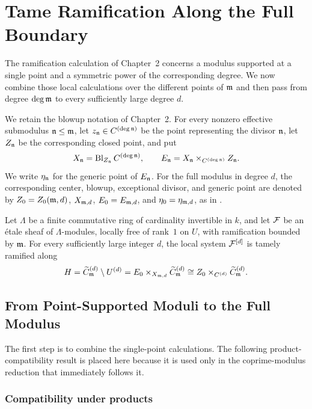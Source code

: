 \section{Tame Ramification Along the Full Boundary}\label{section:tame-ramification-full-boundary}

The ramification calculation of Chapter~2 concerns a modulus supported at a
single point and a symmetric power of the corresponding degree. We now
combine those local calculations over the different points of $\mathfrak{m}$ and
then pass from degree $\deg\mathfrak{m}$ to every sufficiently large degree $d$.

We retain the blowup notation of Chapter~2. For every nonzero effective
submodulus $\mathfrak{n}\leq\mathfrak{m}$, let $z_{\mathfrak{n}}\in C^{(\deg\mathfrak{n})}$ be the
point representing the divisor $\mathfrak{n}$, let $Z_{\mathfrak{n}}$ be the
corresponding closed point, and put
\[
    X_{\mathfrak{n}}=\operatorname{Bl}_{Z_{\mathfrak{n}}}
        C^{(\deg\mathfrak{n})},
    \qquad
    E_{\mathfrak{n}}=X_{\mathfrak{n}}\times_{C^{(\deg\mathfrak{n})}}Z_{\mathfrak{n}}.
\]
We write $\eta_{\mathfrak{n}}$ for the generic point of $E_{\mathfrak{n}}$. For the
full modulus in degree $d$, the corresponding center, blowup, exceptional
divisor, and generic point are denoted by $Z_0=Z_0(\mathfrak{m},d)$,
$X_{\mathfrak{m},d}$, $E_0=E_{\mathfrak{m},d}$, and $\eta_0=\eta_{\mathfrak{m},d}$, as in
.

\begin{theorem}\label{theorem:SymmetricPowerOfSheafIsTamelyRamified}
Let $\Lambda$ be a finite commutative ring of cardinality invertible in $k$, and let
$\mathcal{F}$ be an \'etale sheaf of $\Lambda$-modules, locally free of rank~$1$ on
$U$, with ramification bounded by $\mathfrak{m}$. For every sufficiently large
integer $d$, the local system $\mathcal{F}^{[d]}$ is tamely ramified along
\[
H=\widetilde C^{(d)}_{\mathfrak{m}}\setminus U^{(d)}
  =E_0\times_{X_{\mathfrak{m},d}}\widetilde C^{(d)}_{\mathfrak{m}}
  \cong Z_0\times_{C^{(d)}}\widetilde C^{(d)}_{\mathfrak{m}}.
\]
\end{theorem}

\subsection{From Point-Supported Moduli to the Full Modulus}

The first step is to combine the single-point calculations. The following
product-compatibility result is placed here because it is used only in the
coprime-modulus reduction that immediately follows it.

\subsubsection{Compatibility under products}\label{subsection:ram_prod_analysis}


